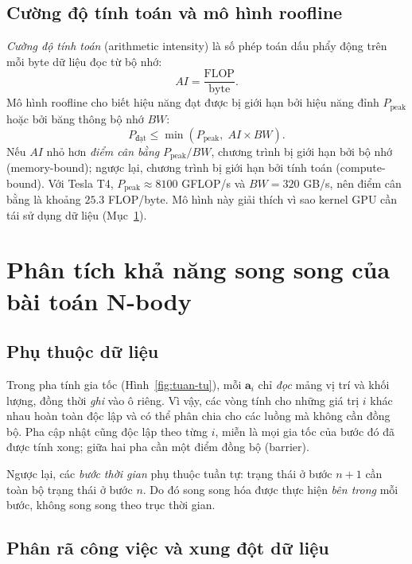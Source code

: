 \subsection{Cường độ tính toán và mô hình roofline}
\label{sec:roofline}

\emph{Cường độ tính toán} (arithmetic intensity) là số phép toán dấu phẩy động trên mỗi byte dữ liệu đọc từ bộ nhớ:
\begin{equation}
AI = \frac{\text{FLOP}}{\text{byte}}.
\end{equation}
Mô hình roofline cho biết hiệu năng đạt được bị giới hạn bởi hiệu năng đỉnh $P_{\text{peak}}$ hoặc bởi băng thông bộ nhớ $BW$:
\begin{equation}
P_{\text{đạt}} \le \min\left(P_{\text{peak}},\; AI \times BW\right).
\label{eq:roofline}
\end{equation}
Nếu $AI$ nhỏ hơn \emph{điểm cân bằng} $P_{\text{peak}}/BW$, chương trình bị giới hạn bởi bộ nhớ (memory-bound); ngược lại, chương trình bị giới hạn bởi tính toán (compute-bound). Với Tesla T4, $P_{\text{peak}} \approx 8100$ GFLOP/s và $BW = 320$ GB/s, nên điểm cân bằng là khoảng $25.3$ FLOP/byte. Mô hình này giải thích vì sao kernel GPU cần tái sử dụng dữ liệu (Mục~\ref{sec:phan-tich-nbody}).

\section{Phân tích khả năng song song của bài toán N-body}
\label{sec:phan-tich-nbody}

\subsection{Phụ thuộc dữ liệu}

Trong pha tính gia tốc (Hình~\ref{fig:tuan-tu}), mỗi $\mathbf{a}_i$ chỉ \emph{đọc} mảng vị trí và khối lượng, đồng thời \emph{ghi} vào ô  riêng. Vì vậy, các vòng tính cho những giá trị $i$ khác nhau hoàn toàn độc lập và có thể phân chia cho các luồng mà không cần đồng bộ. Pha cập nhật cũng độc lập theo từng $i$, miễn là mọi gia tốc của bước đó đã được tính xong; giữa hai pha cần một điểm đồng bộ (barrier).

Ngược lại, các \emph{bước thời gian} phụ thuộc tuần tự: trạng thái ở bước $n+1$ cần toàn bộ trạng thái ở bước $n$. Do đó song song hóa được thực hiện \emph{bên trong} mỗi bước, không song song theo trục thời gian.

\subsection{Phân rã công việc và xung đột dữ liệu}

